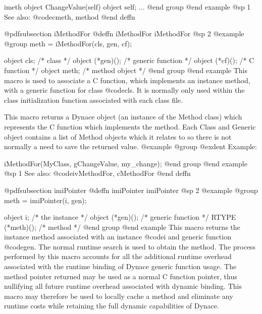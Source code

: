 {{{{imeth object  ChangeValue(self)
object self;
{
        ...
}
@end group
@end example
@sp 1
See also:  @code{cmeth, method}
@end deffn













@pdfsubsection {iMethodFor}
@deffn {iMethodFor} iMethodFor
@sp 2
@example
@group
meth = iMethodFor(cls, gen, cf);

object  cls;            /*  class               */
object  (*gen)();       /*  generic function    */
object  (*cf)();        /*  C function          */
object  meth;           /*  method object       */
@end group
@end example
This macro is used to associate a C function, which implements an
instance method, with a generic function for class @code{cls}.  It is
normally only used within the class initialization function associated
with each class file.

This macro returns a Dynace object (an instance of the Method class) which
represents the C function which implements the method.  Each Class 
and Generic object contains a list of Method objects which it relates
to so there is not normally a need to save the returned value.
@example
@group
@exdent Example:

iMethodFor(MyClass, gChangeValue, my_change);
@end group
@end example
@sp 1
See also:  @code{ivMethodFor, cMethodFor}
@end deffn

















@pdfsubsection {imiPointer}
@deffn {imiPointer} imiPointer
@sp 2
@example
@group
meth = imiPointer(i, gen);

object  i;              /*  the instance        */
object  (*gen)();       /*  generic function    */
RTYPE   (*meth)();      /*  method              */
@end group
@end example
This macro returns the instance method associated with an instance 
@code{i} and generic function @code{gen}.  The normal runtime
search is used to obtain the method.  The process performed by this
macro accounts for all the additional runtime overhead associated with
the runtime binding of Dynace generic function usage.  The method pointer
returned may be used as a normal C function pointer, thus nullifying all
future runtime overhead associated with dynamic binding.  This macro may
therefore be used to locally cache a method and eliminate any runtime
costs while retaining the full dynamic capabilities of Dynace.

}}}}

